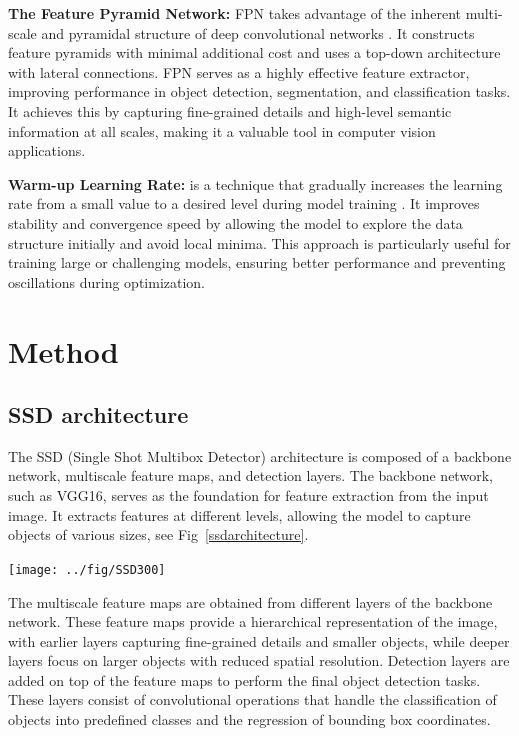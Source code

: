 \documentclass[a4paper]{article}
\begin{document}
	\textbf{The Feature Pyramid Network:} FPN takes advantage of the inherent multi-scale and pyramidal structure of deep convolutional networks \cite{fpn}. It constructs feature pyramids with minimal additional cost and uses a top-down architecture with lateral connections. FPN serves as a highly effective feature extractor, improving performance in object detection, segmentation, and classification tasks. It achieves this by capturing fine-grained details and high-level semantic information at all scales, making it a valuable tool in computer vision applications.
	
	\textbf{Warm-up Learning Rate:} is a technique that gradually increases the learning rate from a small value to a desired level during model training \cite{warmup}. It improves stability and convergence speed by allowing the model to explore the data structure initially and avoid local minima. This approach is particularly useful for training large or challenging models, ensuring better performance and preventing oscillations during optimization.
	
	\section{Method}
	\subsection{SSD architecture}
	The SSD (Single Shot Multibox Detector) architecture is composed of a backbone network, multiscale feature maps, and detection layers. The backbone network, such as VGG16, serves as the foundation for feature extraction from the input image. It extracts features at different levels, allowing the model to capture objects of various sizes, see Fig~\ref{ssdarchitecture}.
	
	\begin{center}
		\texttt{[image: ../fig/SSD300]}
		\label{ssdarchitecture}
	\end{center}
	
	The multiscale feature maps are obtained from different layers of the backbone network. These feature maps provide a hierarchical representation of the image, with earlier layers capturing fine-grained details and smaller objects, while deeper layers focus on larger objects with reduced spatial resolution. Detection layers are added on top of the feature maps to perform the final object detection tasks. These layers consist of convolutional operations that handle the classification of objects into predefined classes and the regression of bounding box coordinates.
	
\end{document}

